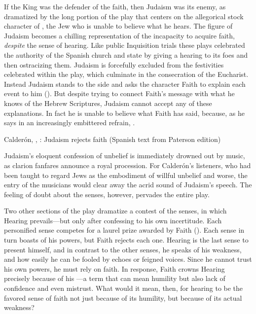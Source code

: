If the King was the defender of the faith, then Judaism was its enemy, as
dramatized by the long portion of the play that centers on the allegorical
stock character of , the Jew who is unable to believe what he
hears.
The figure of Judaism becomes a chilling representation of the incapacity to
acquire faith, \emph{despite} the sense of hearing.
Like public Inquisition trials these plays celebrated the authority of the
Spanish church and state by giving a hearing to its foes and then ostracizing
them.
Judaism is forcefully excluded from the festivities celebrated within the play,
which culminate in the consecration of the Eucharist.
Instead Judaism stands to the side and asks the character Faith to explain each
event to him ().
But despite trying to connect Faith's message with what he knows of the Hebrew
Scriptures, Judaism cannot accept any of these explanations.
In fact he is unable to believe what Faith has said, because, as he says in an
increasingly embittered refrain, .


\begin{poemexample}
    \caption{Calderón, ,
    : Judaism rejects faith (Spanish text from Paterson
    edition)}
    \label{poem:Calderon-Retiro-Judaismo}
\end{poemexample}

Judaism's eloquent confession of unbelief is immediately drowned out by music,
as clarion fanfares announce a royal procession.
For Calderón's listeners, who had been taught to regard Jews as the embodiment
of willful unbelief and worse, the entry of the musicians would clear away the
acrid sound of Judaism's speech.
The feeling of doubt about the senses, however, pervades the entire play.


Two other sections of the play dramatize a contest of the senses, in which
Hearing prevails---but only after confessing to his own incertitude.
Each personified sense competes for a laurel prize awarded by Faith
().
Each sense in turn boasts of his powers, but Faith rejects each one.
Hearing is the last sense to present himself, and in contrast to the other
senses, he speaks of his weakness, and how easily he can be fooled by echoes or
feigned voices.
Since he cannot trust his own powers, he must rely on faith.
In response, Faith crowns Hearing precisely because of his
---a term that can mean humility but also lack of
confidence and even mistrust.
What would it mean, then, for hearing to be the favored sense of faith not just
because of its humility, but because of its actual weakness?

